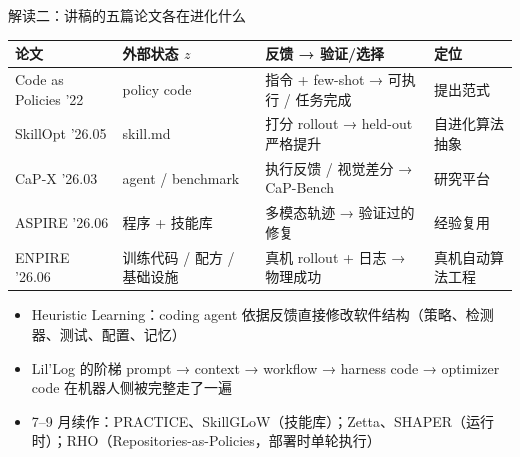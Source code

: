 \documentclass[aspectratio=169,10pt]{beamer}
\begin{document}
\begin{frame}{解读二：讲稿的五篇论文各在进化什么}
\begin{center}
\vspace{4pt}
\footnotesize
\begin{tabular}{@{}llll@{}}
\toprule
论文 & 外部状态 $z$ & 反馈 → 验证/选择 & 定位 \\
\midrule
Code as Policies '22 & policy code & 指令 + few-shot → 可执行 / 任务完成 & 提出范式 \\
SkillOpt '26.05 & skill.md & 打分 rollout → held-out 严格提升 & 自进化算法抽象 \\
CaP-X '26.03 & agent / benchmark & 执行反馈 / 视觉差分 → CaP-Bench & 研究平台 \\
ASPIRE '26.06 & 程序 + 技能库 & 多模态轨迹 → 验证过的修复 & 经验复用 \\
ENPIRE '26.06 & 训练代码 / 配方 / 基础设施 & 真机 rollout + 日志 → 物理成功 & 真机自动算法工程 \\
\bottomrule
\end{tabular}
\end{center}
\begin{itemize}
  \item Heuristic Learning：coding agent 依据反馈直接修改软件结构（策略、检测器、测试、配置、记忆）
  \item Lil'Log 的阶梯 prompt → context → workflow → harness code → optimizer code 在机器人侧被完整走了一遍
  \item 7--9 月续作：PRACTICE、SkillGLoW（技能库）；Zetta、SHAPER（运行时）；RHO（Repositories-as-Policies，部署时单轮执行）
\end{itemize}
\end{frame}
\end{document}
